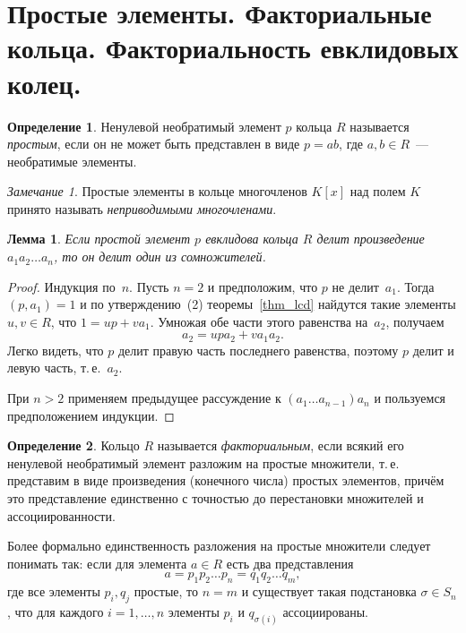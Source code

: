 \documentclass[a4paper, 12pt]{article}
\newtheorem{lemma}{Лемма}
\theoremstyle{definition}
\newtheorem{definition}{Определение}
\theoremstyle{remark}
\newtheorem{remark}{Замечание}
\begin{document}
\section{Простые элементы. Факториальные кольца. Факториальность евклидовых колец.}

\begin{definition}
Ненулевой необратимый элемент $p$ кольца $R$ называется {\it
простым}, если он не может быть представлен в виде $p = a b$, где
$a, b \in R$~--- необратимые элементы.
\end{definition}

\begin{remark}
Простые элементы в кольце многочленов $K[x]$ над полем $K$ принято
называть {\it неприводимыми многочленами}.
\end{remark}

\begin{lemma} \label{ll}
Если простой элемент $p$ евклидова кольца $R$ делит произведение
$a_1a_2\ldots a_n$, то он делит один из сомножителей.
\end{lemma}

\begin{proof}
Индукция по~$n$. Пусть $n=2$ и предположим, что $p$ не делит~$a_1$.
Тогда $(p, a_1) = 1$ и по утверждению~(2) теоремы~\ref{thm_lcd}
найдутся такие элементы $u, v \in R$, что $1 = up + v a_1$. Умножая
обе части этого равенства на~$a_2$, получаем
$$
a_2 = upa_2 + v a_1a_2.
$$
Легко видеть, что $p$ делит правую часть последнего равенства,
поэтому $p$ делит и левую часть, т.\,е.~$a_2$.

При $n > 2$ применяем предыдущее рассуждение к $(a_1 \ldots
a_{n-1})a_n$ и пользуемся предположением индукции.
\end{proof}

\begin{definition}
Кольцо $R$ называется {\it факториальным}, если всякий его ненулевой
необратимый элемент \guillemotleft разложим на простые
множители\guillemotright{}, т.\,е. представим в виде произведения
(конечного числа) простых элементов, причём это представление
единственно с точностью до перестановки множителей и
ассоциированности.
\end{definition}

Более формально единственность разложения на простые множители
следует понимать так: если для элемента $a \in R$ есть два
представления
$$
a = p_1 p_2 \ldots p_n = q_1q_2 \ldots q_m,
$$
где все элементы $p_i, q_j$ простые, то $n = m$ и существует такая
подстановка $\sigma \in S_n$, что для каждого $i = 1,\ldots, n$
элементы $p_i$ и $q_{\sigma(i)}$ ассоциированы.
\end{document}
